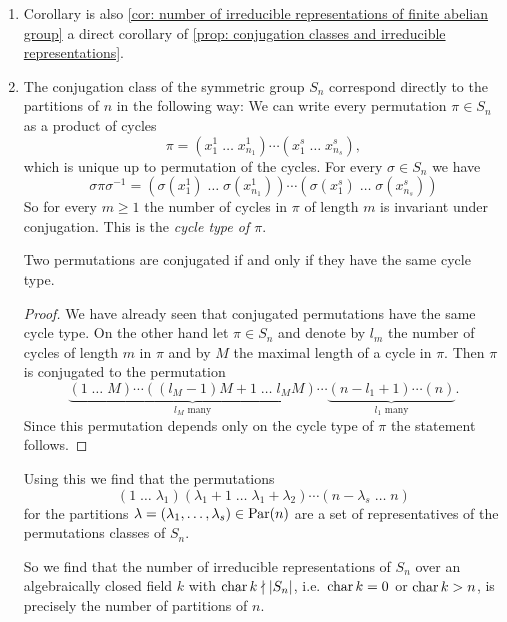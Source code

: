 \begin{expls}
  \begin{enumerate}[label=\emph{\alph*)}, leftmargin=*]
    \item
      Corollary is also \ref{cor: number of irreducible representations of finite abelian group} a direct corollary of \ref{prop: conjugation classes and irreducible representations}.
    \item
      The conjugation class of the symmetric group $S_n$ correspond directly to the partitions of $n$ in the following way:
      We can write every permutation $\pi \in S_n$ as a product of cycles
      \[
          \pi
        =         \left( x^1_1 \; \dots \; x^1_{n_1} \right)
          \dotsm  \left(x^s_1 \; \dots \; x^s_{n_s} \right),
      \]
      which is unique up to permutation of the cycles. For every $\sigma \in S_n$ we have
      \[
          \sigma \pi \sigma^{-1}
        =         \left(
                        \sigma\left( x^1_1 \right)
                    \;  \dotso
                    \;  \sigma\left( x^1_{n_1} \right)
                  \right)
          \dotsm  \left(
                        \sigma\left( x^s_1 \right)
                    \;  \dotso
                    \;  \sigma\left( x^s_{n_s} \right)
                  \right)
      \]
      So for every $m \geq 1$ the number of cycles in $\pi$ of length $m$ is invariant under conjugation.
      This is the \emph{cycle type of $\pi$}.
      
      \begin{claim}
        Two permutations are conjugated if and only if they have the same cycle type.
      \end{claim}
      \begin{proof}
        We have already seen that conjugated permutations have the same cycle type.
        On the other hand let $\pi \in S_n$ and denote by $l_m$ the number of cycles of length $m$ in $\pi$ and by $M$ the maximal length of a cycle in $\pi$.
        Then $\pi$ is conjugated to the permutation
        \[
                  \underbrace{ (1 \; \dots \; M) \dotsm ((l_M-1)M+1 \; \dots \; l_M M) }_{ \text{$l_M$ many} }
          \dotsm  \underbrace{ (n-l_1+1) \dotsm (n) }_{ \text{$l_1$ many} }.
        \]
        Since this permutation depends only on the cycle type of $\pi$ the statement follows.
      \end{proof}
      
      Using this we find that the permutations
      \[
                (1 \; \dotso \; \lambda_1)
                (\lambda_1 + 1 \; \dotso \; \lambda_1 + \lambda_2)
        \dotsm  (n-\lambda_s \; \dots \; n)
      \]
      for the partitions $\lambda = (\lambda_1, \dotsc, \lambda_s) \in \operatorname{Par}(n)$ are a set of representatives of the permutations classes of $S_n$.
      
      So we find that the number of irreducible representations of $S_n$ over an algebraically closed field $k$ with $\operatorname{char} k \nmid |S_n|$, i.e.\ $\operatorname{char} k = 0$ or $\operatorname{char} k > n$, is precisely the number of partitions of $n$.
  \end{enumerate}
\end{expls}



